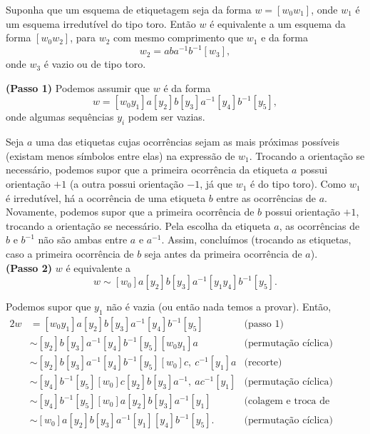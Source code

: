 \begin{lemma} %
    Suponha que um esquema de etiquetagem seja da forma $w = [w_0 w_1]$, onde $w_1$ é um esquema irredutível do tipo toro. Então $w$ é equivalente a um esquema da forma $[w_0 w_2]$, para $w_2$ com mesmo comprimento que $w_1$ e da forma
    \[w_2 = aba^{-1}b^{-1}[w_3],\]
    onde $w_3$ é vazio ou de tipo toro.
    \begin{dem}
        \noindent \textbf{(Passo 1)} Podemos assumir que $w$ é da forma
        \[w = [w_0 y_1] a [y_2] b [y_3] a^{-1} [y_4] b^{-1} [y_5],\]
        onde algumas sequências $y_i$ podem ser vazias.

        Seja $a$ uma das etiquetas cujas ocorrências sejam as mais próximas possíveis (existam menos símbolos entre elas) na expressão de $w_1$. Trocando a orientação se necessário, podemos supor que a primeira ocorrência da etiqueta $a$ possui orientação $+1$ (a outra possui orientação $-1$, já que $w_1$ é do tipo toro). Como $w_1$ é irredutível, há a ocorrência de uma etiqueta $b$ entre as ocorrências de $a$. Novamente, podemos supor que a primeira ocorrência de $b$ possui orientação $+1$, trocando a orientação se necessário. Pela escolha da etiqueta $a$, as ocorrências de $b$ e $b^{-1}$ não são ambas entre $a$ e $a^{-1}$. Assim, concluímos (trocando as etiquetas, caso a primeira ocorrência de $b$ seja antes da primeira ocorrência de $a$).\\

        \noindent \textbf{(Passo 2)} $w$ é equivalente a
        \[w \sim 
        [w_0] a [y_2] b [y_3] a^{-1} [y_1 y_4] b^{-1} [y_5].\]

        Podemos supor que $y_1$ não é vazia (ou então nada temos a provar). Então,
        \begin{alignat*}{2}
            w &= [w_0 y_1] a [y_2] b [y_3] a^{-1} [y_4] b^{-1} [y_5] &\text{(passo 1)}\\
            &\sim [y_2] b [y_3] a^{-1} [y_4] b^{-1} [y_5] [w_0 y_1] a &\text{(permutação cíclica)}\\
            &\sim [y_2] b [y_3] a^{-1} [y_4] b^{-1} [y_5] [w_0] c,\ c^{-1} [y_1] a &\text{(recorte)}\\
            &\sim [y_4] b^{-1} [y_5] [w_0] c [y_2] b [y_3] a^{-1},\ a c^{-1} [y_1] &\text{(permutação cíclica)}\\
            &\sim [y_4] b^{-1} [y_5] [w_0] a [y_2] b [y_3] a^{-1} [y_1] &\text{(colagem e troca de etiquetas)}\\
            &\sim [w_0] a [y_2] b [y_3] a^{-1} [y_1] [y_4] b^{-1} [y_5]. &\text{(permutação cíclica)}
        \end{alignat*}\\


\end{dem}
\end{lemma}
